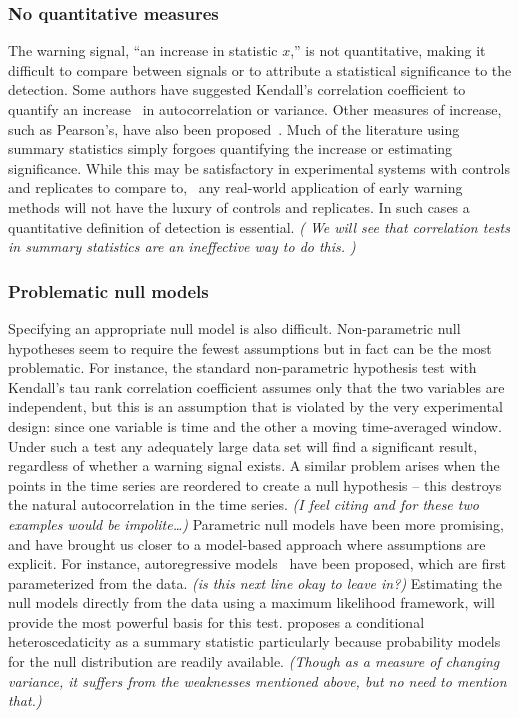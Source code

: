 \documentclass[authoryear,preprint,11pt]{elsarticle}
\newcommand{\cb}[1]{{\it \color{darkgreen} (#1)}}
\begin{document}
\subsubsection*{No quantitative measures}
The warning signal, ``an increase in statistic $x$,'' is not quantitative,
making it difficult to compare between signals or to
attribute a statistical significance to the detection.
Some authors have suggested Kendall's correlation coefficient to quantify an increase~\citep{Dakos2008, Dakos20011} 
in autocorrelation or variance.  
Other measures of increase, such as Pearson's, have also been proposed~\citep{Drake2010}.  
Much of the literature using summary statistics simply forgoes quantifying
the increase or estimating significance.  
While this may be satisfactory in experimental systems with controls and replicates to compare to,~\citep[\emph{e.g.}][]{Drake2010, Carpenter2011}
any real-world application of early warning methods will not have the luxury of controls and replicates.
In such cases a quantitative definition of detection is essential.  
\cb{ We will see that correlation tests in summary statistics are an ineffective way to do this.  }


\subsubsection*{Problematic null models}
Specifying an appropriate null model is also difficult.  
Non-parametric null hypotheses seem to require the fewest assumptions but in fact can be the most problematic.  
For instance, the standard non-parametric hypothesis test with Kendall's tau rank correlation coefficient
assumes only that the two variables are independent, but this is
an assumption that is violated by the very experimental design:
since one variable is time and the other a moving time-averaged window.  
Under such a test any adequately large data set will find a significant result, regardless of whether a warning signal exists.
A similar problem arises when the points in the time series are reordered to create a null hypothesis -- 
this destroys the natural autocorrelation in the time series.  
\cb{I feel citing \citet{Dakos2011} and \citet{Dakos2008} for these two examples would be impolite\dots} 
Parametric null models have been more promising, and have brought us closer to a model-based approach where assumptions are explicit.  
For instance, autoregressive models~\citet{Dakos2008} have been proposed, which are first parameterized from the data.  
\cb{is this next line okay to leave in?}
Estimating the null models directly from the data using a maximum likelihood framework, will provide the most powerful basis for this test.  
\citet{Seekell2011} proposes a conditional heteroscedaticity as a summary statistic particularly because probability models for the null distribution are readily available.\cb{Though as a measure of changing variance, it suffers from the weaknesses mentioned above, but no need to mention that.} 
\end{document}
